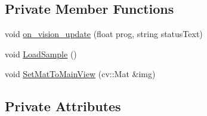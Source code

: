 \subsection*{Private Member Functions}
\begin{DoxyCompactItemize}
\item 
void \hyperlink{class_v_s_a_g_u_i_a8a5092f741e17c73b04850a6b30dda04}{on\+\_\+vision\+\_\+update} (float prog, string status\+Text)
\item 
void \hyperlink{class_v_s_a_g_u_i_af1c434680cdcf3abb268092355eb787e}{Load\+Sample} ()
\item 
void \hyperlink{class_v_s_a_g_u_i_a988508cf880e27fcd8a029b94e546bcc}{Set\+Mat\+To\+Main\+View} (cv\+::\+Mat \&img)
\end{DoxyCompactItemize}
\subsection*{Private Attributes}
